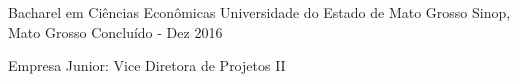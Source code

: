 \documentclass[11pt, letter]{awesome-cv}
\begin{document}
	\makecvheader
\vspace{-1mm}
\vspace{-3mm}
\begin{cventries}
	\cventry
	{Bacharel em Ciências Econômicas}
	{Universidade do Estado de Mato Grosso\vspace{-2mm}}
	{Sinop, Mato Grosso\vspace{-2mm}}
	{Concluído - Dez 2016}
	{
		\begin{cvitems}
			\vspace{-2mm}
			\item {Empresa Junior: Vice Diretora de Projetos II\vspace{-2mm}}
		\end{cvitems}
	}
\end{cventries}
\end{document}
